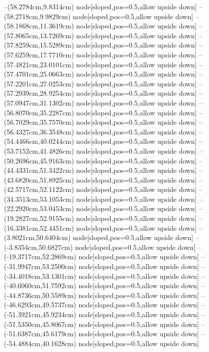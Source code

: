 --(58.2784cm,9.8314cm) node[sloped,pos=0.5,allow upside down]{\ArrowIn}
--(58.2718cm,9.9829cm) node[sloped,pos=0.5,allow upside down]{\arrowIn}
--(58.1868cm,11.3619cm) node[sloped,pos=0.5,allow upside down]{\ArrowIn}
--(57.8065cm,13.7269cm) node[sloped,pos=0.5,allow upside down]{\ArrowIn}
--(57.8259cm,15.5289cm) node[sloped,pos=0.5,allow upside down]{\ArrowIn}
--(57.6259cm,17.7710cm) node[sloped,pos=0.5,allow upside down]{\ArrowIn}
--(57.4821cm,23.0101cm) node[sloped,pos=0.5,allow upside down]{\ArrowIn}
--(57.4701cm,25.0663cm) node[sloped,pos=0.5,allow upside down]{\ArrowIn}
--(57.2201cm,27.0253cm) node[sloped,pos=0.5,allow upside down]{\ArrowIn}
--(57.2939cm,28.9254cm) node[sloped,pos=0.5,allow upside down]{\ArrowIn}
--(57.0947cm,31.1302cm) node[sloped,pos=0.5,allow upside down]{\ArrowIn}
--(56.8070cm,35.2287cm) node[sloped,pos=0.5,allow upside down]{\ArrowIn}
--(56.7029cm,35.7570cm) node[sloped,pos=0.5,allow upside down]{\arrowIn}
--(56.4327cm,36.3548cm) node[sloped,pos=0.5,allow upside down]{\arrowIn}
--(54.4466cm,40.0244cm) node[sloped,pos=0.5,allow upside down]{\ArrowIn}
--(53.7152cm,41.4826cm) node[sloped,pos=0.5,allow upside down]{\ArrowIn}
--(50.2696cm,45.9163cm) node[sloped,pos=0.5,allow upside down]{\ArrowIn}
--(44.4331cm,51.3422cm) node[sloped,pos=0.5,allow upside down]{\ArrowIn}
--(43.6820cm,51.8925cm) node[sloped,pos=0.5,allow upside down]{\arrowIn}
--(42.5717cm,52.1122cm) node[sloped,pos=0.5,allow upside down]{\ArrowIn}
--(34.3513cm,53.1053cm) node[sloped,pos=0.5,allow upside down]{\ArrowIn}
--(22.2920cm,53.0453cm) node[sloped,pos=0.5,allow upside down]{\ArrowIn}
--(19.2827cm,52.9155cm) node[sloped,pos=0.5,allow upside down]{\ArrowIn}
--(16.3381cm,52.4451cm) node[sloped,pos=0.5,allow upside down]{\ArrowIn}
--(3.8021cm,50.6404cm) node[sloped,pos=0.5,allow upside down]{\ArrowIn}
--(-3.8354cm,50.6827cm) node[sloped,pos=0.5,allow upside down]{\ArrowIn}
--(-19.3717cm,52.2869cm) node[sloped,pos=0.5,allow upside down]{\ArrowIn}
--(-31.9947cm,53.2500cm) node[sloped,pos=0.5,allow upside down]{\ArrowIn}
--(-34.4018cm,53.1301cm) node[sloped,pos=0.5,allow upside down]{\ArrowIn}
--(-40.6060cm,51.7592cm) node[sloped,pos=0.5,allow upside down]{\ArrowIn}
--(-44.8736cm,50.5589cm) node[sloped,pos=0.5,allow upside down]{\ArrowIn}
--(-46.6293cm,49.5737cm) node[sloped,pos=0.5,allow upside down]{\ArrowIn}
--(-51.3921cm,45.9234cm) node[sloped,pos=0.5,allow upside down]{\ArrowIn}
--(-51.5350cm,45.8067cm) node[sloped,pos=0.5,allow upside down]{\arrowIn}
--(-51.6387cm,45.6179cm) node[sloped,pos=0.5,allow upside down]{\arrowIn}
--(-54.4884cm,40.1628cm) node[sloped,pos=0.5,allow upside down]{\ArrowIn}
